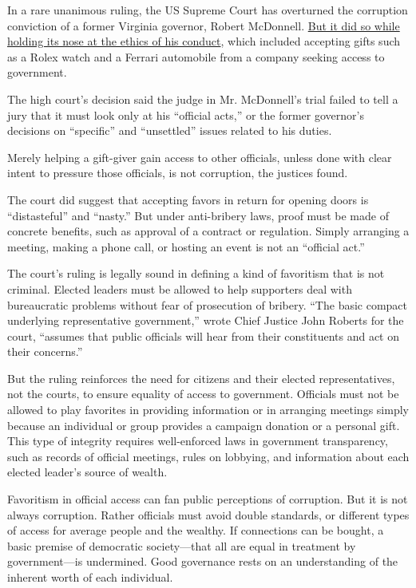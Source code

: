 In a rare unanimous ruling, the US Supreme Court has overturned the
corruption conviction of a former Virginia governor, Robert McDonnell.
\uline{But it did so while holding its nose at the ethics of his
	conduct}, which included accepting gifts such as a Rolex watch and a
Ferrari automobile from a company seeking access to government.

The high court's decision said the judge in Mr. McDonnell's trial
failed to tell a jury that it must look only at his ``official acts,''
or the former governor's decisions on ``specific'' and ``unsettled''
issues related to his duties.

Merely helping a gift-giver gain access to other officials, unless done
with clear intent to pressure those officials, is not corruption, the
justices found.

The court did suggest that accepting favors in return for opening doors
is ``distasteful'' and ``nasty.'' But under anti-bribery laws, proof
must be made of concrete benefits, such as approval of a contract or
regulation. Simply arranging a meeting, making a phone call, or hosting
an event is not an ``official act.''

The court's ruling is legally sound in defining a kind of favoritism
that is not criminal. Elected leaders must be allowed to help
supporters deal with bureaucratic problems without fear of prosecution
of bribery. ``The basic compact underlying representative government,''
wrote Chief Justice John Roberts for the court, ``assumes that public
officials will hear from their constituents and act on their concerns.''

But the ruling reinforces the need for citizens and their elected
representatives, not the courts, to ensure equality of access to
government. Officials must not be allowed to play favorites in
providing information or in arranging meetings simply because an
individual or group provides a campaign donation or a personal gift.
This type of integrity requires well-enforced laws in government
transparency, such as records of official meetings, rules on lobbying,
and information about each elected leader's source of wealth.

Favoritism in official access can fan public perceptions of corruption.
But it is not always corruption. Rather officials must avoid double
standards, or different types of access for average people and the
wealthy. If connections can be bought, a basic premise of democratic
society---that all are equal in treatment by government---is
undermined. Good governance rests on an understanding of the inherent
worth of each individual.

